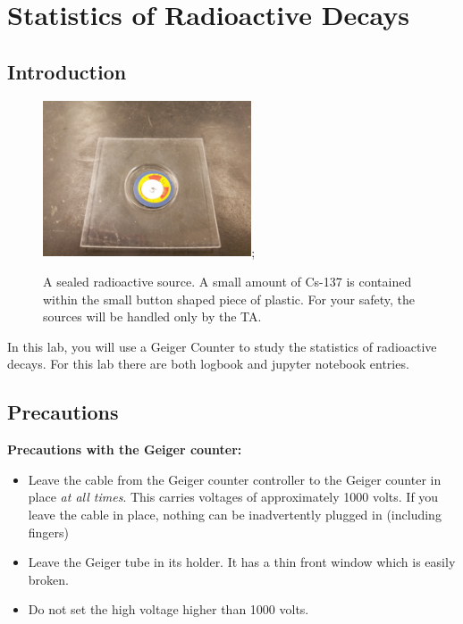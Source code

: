 \chapter{Statistics of Radioactive Decays}


\section{Introduction}

\begin{figure}[htbp]
\begin{center}
 \includegraphics[width=0.55\textwidth]{figs/labs/geiger/source.jpg};
\caption{\label{fig:source} A sealed radioactive source.  A small amount of Cs-137 is contained within the small button shaped piece of plastic.  For your safety, the sources will be handled only by the TA.}
\end{center}
\end{figure}

In this lab, you will use a Geiger Counter to study the statistics of radioactive decays.  For this lab there are both logbook and jupyter notebook entries.

\section{Precautions}

\noindent
{\bf Precautions with the Geiger counter:}
\begin{itemize}
\item Leave the cable from the Geiger counter controller to the Geiger counter in place {\em at all times}.  This carries voltages of approximately 1000 volts.  If you leave the cable in place, nothing can be inadvertently plugged in (including fingers)
\item Leave the Geiger tube in its holder.  It has a thin front window which is easily broken.
\item Do not set the high voltage higher than 1000 volts.
\end{itemize}

